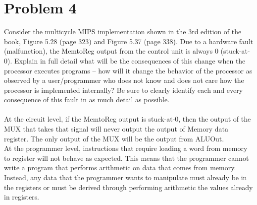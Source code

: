 \documentclass[10pt,letterpaper]{article}
\begin{document}
\section{Problem 4}
Consider the multicycle MIPS implementation shown in the 3rd edition of the book, Figure 5.28 (page 323) and Figure 5.37 (page 338). Due to a hardware fault (malfunction), the MemtoReg output from the control unit is always 0 (stuck-at-0). Explain in full detail what will be the consequences of this change when the processor executes programs -- how will it change the behavior of the processor as observed by a user/programmer who does not know and does not care how the processor is implemented internally? Be sure to clearly identify each and every consequence of this fault in as much detail as possible.\\\\
At the circuit level, if the MemtoReg output is stuck-at-0, then the output of the MUX that takes that signal will never output the output of Memory data register. The only output of the MUX will be the output from ALUOut.\\ 
At the programmer level, instructions that require loading a word from memory to register will not behave as expected. This means that the programmer cannot write a program that performs arithmetic on data that comes from memory. Instead, any data that the programmer wants to manipulate must already be in the registers or must be derived through performing arithmetic the values already in registers.
\pagebreak

\end{document}
